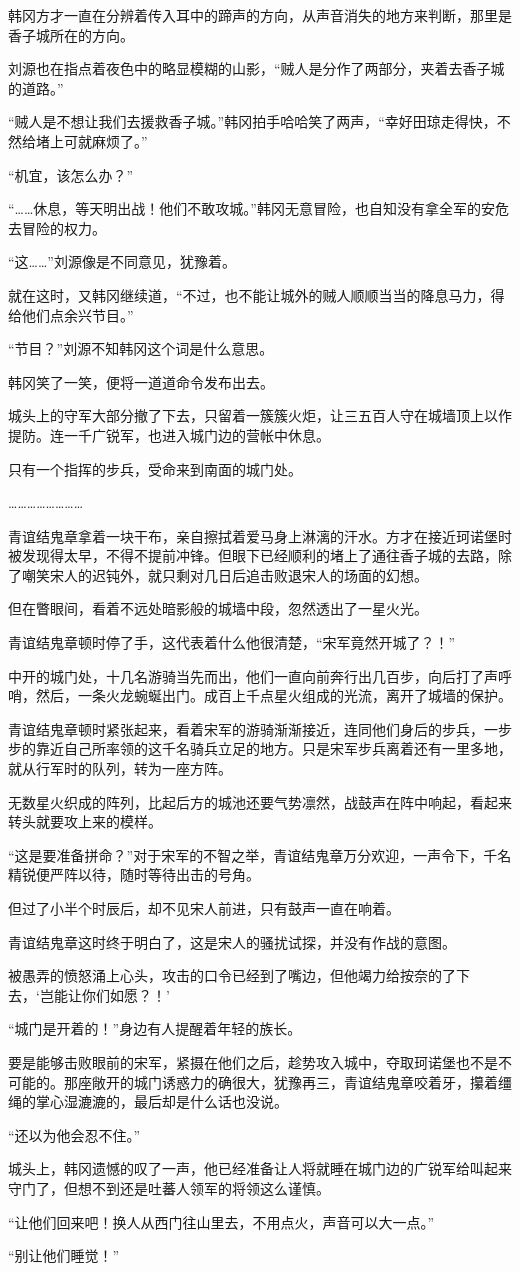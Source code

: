 韩冈方才一直在分辨着传入耳中的蹄声的方向，从声音消失的地方来判断，那里是香子城所在的方向。

刘源也在指点着夜色中的略显模糊的山影，“贼人是分作了两部分，夹着去香子城的道路。”

“贼人是不想让我们去援救香子城。”韩冈拍手哈哈笑了两声，“幸好田琼走得快，不然给堵上可就麻烦了。”

“机宜，该怎么办？”

“……休息，等天明出战！他们不敢攻城。”韩冈无意冒险，也自知没有拿全军的安危去冒险的权力。

“这……”刘源像是不同意见，犹豫着。

就在这时，又韩冈继续道，“不过，也不能让城外的贼人顺顺当当的降息马力，得给他们点余兴节目。”

“节目？”刘源不知韩冈这个词是什么意思。

韩冈笑了一笑，便将一道道命令发布出去。

城头上的守军大部分撤了下去，只留着一簇簇火炬，让三五百人守在城墙顶上以作提防。连一千广锐军，也进入城门边的营帐中休息。

只有一个指挥的步兵，受命来到南面的城门处。

……………………

青谊结鬼章拿着一块干布，亲自擦拭着爱马身上淋漓的汗水。方才在接近珂诺堡时被发现得太早，不得不提前冲锋。但眼下已经顺利的堵上了通往香子城的去路，除了嘲笑宋人的迟钝外，就只剩对几日后追击败退宋人的场面的幻想。

但在瞥眼间，看着不远处暗影般的城墙中段，忽然透出了一星火光。

青谊结鬼章顿时停了手，这代表着什么他很清楚，“宋军竟然开城了？！”

中开的城门处，十几名游骑当先而出，他们一直向前奔行出几百步，向后打了声呼哨，然后，一条火龙蜿蜒出门。成百上千点星火组成的光流，离开了城墙的保护。

青谊结鬼章顿时紧张起来，看着宋军的游骑渐渐接近，连同他们身后的步兵，一步步的靠近自己所率领的这千名骑兵立足的地方。只是宋军步兵离着还有一里多地，就从行军时的队列，转为一座方阵。

无数星火织成的阵列，比起后方的城池还要气势凛然，战鼓声在阵中响起，看起来转头就要攻上来的模样。

“这是要准备拼命？”对于宋军的不智之举，青谊结鬼章万分欢迎，一声令下，千名精锐便严阵以待，随时等待出击的号角。

但过了小半个时辰后，却不见宋人前进，只有鼓声一直在响着。

青谊结鬼章这时终于明白了，这是宋人的骚扰试探，并没有作战的意图。

被愚弄的愤怒涌上心头，攻击的口令已经到了嘴边，但他竭力给按奈的了下去，‘岂能让你们如愿？！’

“城门是开着的！”身边有人提醒着年轻的族长。

要是能够击败眼前的宋军，紧摄在他们之后，趁势攻入城中，夺取珂诺堡也不是不可能的。那座敞开的城门诱惑力的确很大，犹豫再三，青谊结鬼章咬着牙，攥着缰绳的掌心湿漉漉的，最后却是什么话也没说。

“还以为他会忍不住。”

城头上，韩冈遗憾的叹了一声，他已经准备让人将就睡在城门边的广锐军给叫起来守门了，但想不到还是吐蕃人领军的将领这么谨慎。

“让他们回来吧！换人从西门往山里去，不用点火，声音可以大一点。”

“别让他们睡觉！”

